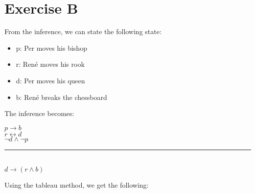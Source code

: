 \section{Exercise B}

From the inference, we can state the following state:

\begin{itemize}
\item
p: Per moves his bishop
\item
r: Ren\'e moves his rook 
\item
d: Per moves his queen
\item
b: Ren\'e breaks the chessboard
\end{itemize}

The inference becomes:

\begin{center}
$ p \to b $ \\
$ r \leftrightarrow d $ \\
$ \neg d \land \neg p $ \\
\noindent\rule{2.5cm}{0.4pt} \\
$ d \to (r \land b) $ \\
\end{center}

\newpage

Using the tableau method, we get the following:

